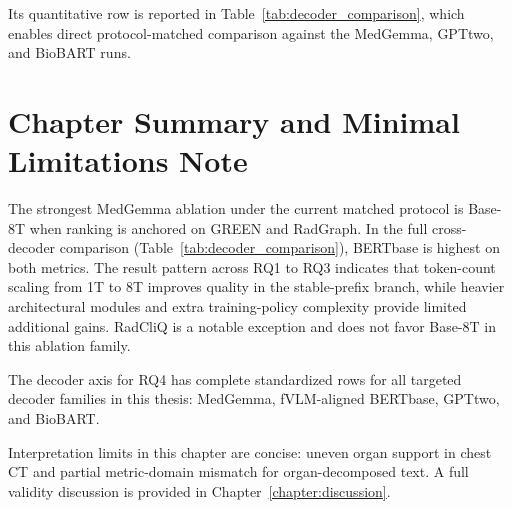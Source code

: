 Its quantitative row is reported in Table~\ref{tab:decoder_comparison}, which enables direct protocol-matched comparison against the MedGemma, \ac{GPTtwo}, and BioBART runs.

\section{Chapter Summary and Minimal Limitations Note}\label{sec:exp_summary}
The strongest MedGemma ablation under the current matched protocol is Base-8T when ranking is anchored on \ac{GREEN} and \ac{RadGraph}. In the full cross-decoder comparison (Table~\ref{tab:decoder_comparison}), \ac{BERTbase} is highest on both metrics. The result pattern across RQ1 to RQ3 indicates that token-count scaling from 1T to 8T improves quality in the stable-prefix branch, while heavier architectural modules and extra training-policy complexity provide limited additional gains. \ac{RadCliQ} is a notable exception and does not favor Base-8T in this ablation family.

The decoder axis for RQ4 has complete standardized rows for all targeted decoder families in this thesis: MedGemma, fVLM-aligned \ac{BERTbase}, \ac{GPTtwo}, and BioBART.

Interpretation limits in this chapter are concise: uneven organ support in chest CT and partial metric-domain mismatch for organ-decomposed text. A full validity discussion is provided in Chapter~\ref{chapter:discussion}.
